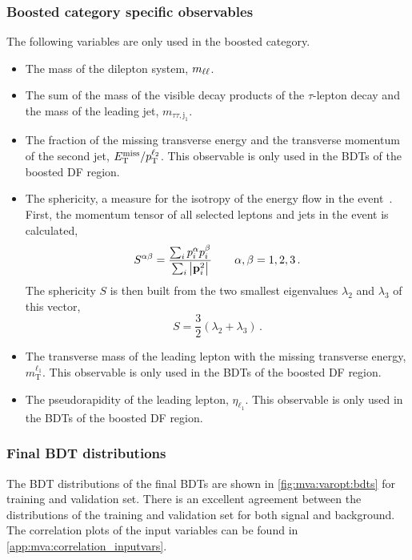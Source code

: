 \subsubsection{Boosted category specific observables}
The following variables are only used in the boosted category.
\begin{itemize}
    \item The mass of the dilepton system, $m_{\ell\ell}$.
    \item The sum of the mass of the visible decay products of the $\tau$-lepton decay and the mass of the leading jet, $m_{\tau\tau,\text{j}_1} $.
    \item The fraction of the missing transverse energy and the transverse momentum of the second jet, $E_\text{T}^\text{miss} / p_\text{T}^{\ell_2}$.
        This observable is only used in the BDTs of the boosted DF region.
    \item The sphericity, a measure for the isotropy of the energy flow in the event~\cite{Sphericity}.
          First, the momentum tensor of all selected leptons and jets in the event is calculated,
          \begin{equation}
              S^{\alpha\beta} = \frac{\sum_i p_i^\alpha p_i^\beta}{\sum_i \left|\mathbf{p}_i^2\right|} \qquad \alpha, \beta = 1,2, 3 \,.
          \end{equation}
          The sphericity $S$ is then built from the two smallest eigenvalues $\lambda_2$ and $\lambda_3$ of this vector,
          \begin{equation}
              S = \frac{3}{2} \left( \lambda_2 + \lambda_3 \right) \,.
          \end{equation}
    \item The transverse mass of the leading lepton with the missing transverse energy, $m_\text{T}^{\ell_1}$.
        This observable is only used in the BDTs of the boosted DF region.
    \item The pseudorapidity of the leading lepton, $\eta_{\ell_1}$.
        This observable is only used in the BDTs of the boosted DF region.
\end{itemize}


\subsubsection{Final BDT distributions}

The BDT distributions of the final BDTs are shown in \cref{fig:mva:varopt:bdts} for training and validation set.
There is an excellent agreement between the distributions of the training and validation set for both signal and background.
The correlation plots of the input variables can be found in \cref{app:mva:correlation_inputvars}.

